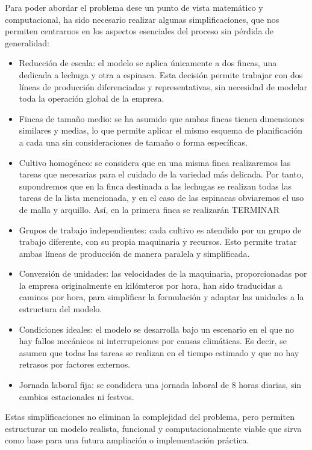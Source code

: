 Para poder abordar el problema dese un punto de vista matemático y computacional, ha sido necesario realizar algunas simplificaciones, que nos permiten centrarnos en los aspectos esenciales del proceso
sin pérdida de generalidad:
\begin{itemize}
    \item Reducción de escala: el modelo se aplica únicamente a dos fincas, una dedicada a lechuga y otra a espinaca. 
          Esta decisión permite trabajar con dos líneas de producción diferenciadas y representativas, sin necesidad de modelar toda la operación global de la empresa.
    \item Fincas de tamaño medio: se ha asumido que ambas fincas tienen dimensiones similares y medias, lo que permite aplicar el mismo esquema de planificación
          a cada una sin consideraciones de tamaño o forma específicas.
    \item Cultivo homogéneo: se considera que en una misma finca realizaremos las tareas que necesarias para el cuidado de la variedad más delicada. 
          Por tanto, supondremos que en la finca destinada a las lechugas se realizan todas las tareas de la lista mencionada, y en el caso de las espinacas obviaremos el uso de malla y arquillo. 
          Así, en la primera finca se realizarán TERMINAR
    \item Grupos de trabajo independientes: cada cultivo es atendido por  un grupo de trabajo diferente, con su propia maquinaria y recursos.
          Esto permite tratar ambas líneas de producción de manera paralela y simplificada.
    \item Conversión de unidades: las velocidades de la maquinaria, proporcionadas por la empresa originalmente en kilómteros por hora, han sido traducidas a caminos por hora,
          para simplificar la formulación y adaptar las unidades a la estructura del modelo.
    \item Condiciones ideales: el modelo se desarrolla bajo un escenario en el que no hay fallos mecánicos ni interrupciones por causas climáticas.
          Es decir, se asumen que todas las tareas se realizan en el tiempo estimado y que no hay retrasos por factores externos.
    \item Jornada laboral fija: se condidera una jornada laboral de 8 horas diarias, sin cambios estacionales ni festvos.
\end{itemize}
 
Estas simplificaciones no eliminan la complejidad del problema, pero permiten estructurar un modelo realista, funcional y computacionalmente viable que sirva como base para una futura ampliación o implementación práctica.






